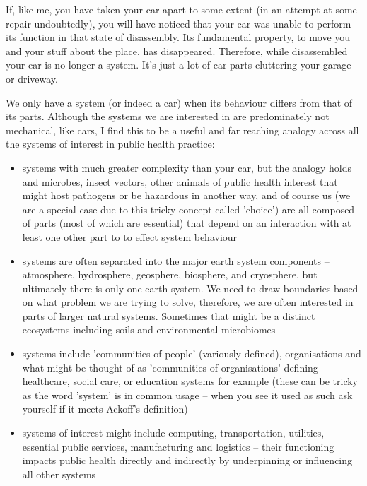 If, like me, you have taken your car apart to some extent (in an attempt at some repair undoubtedly), you will have noticed that your car was unable to perform its function in that state of disassembly. Its fundamental property, to move you and your stuff about the place, has disappeared. Therefore, while disassembled your car is no longer a system. It's just a lot of car parts cluttering your garage or driveway.

We only have a system (or indeed a car) when its behaviour differs from that of its parts. Although the systems we are interested in are predominately not mechanical, like cars, I find this to be a useful and far reaching analogy across all the systems of interest in public health practice:

\begin{itemize}[leftmargin=2cm]
	\item[organisms] systems with much greater complexity than your car, but the analogy holds and microbes, insect vectors, other animals of public health interest that might host pathogens or be hazardous in another way, and of course us (we are a special case due to this tricky concept called 'choice') are all composed of parts (most of which are essential) that depend on an interaction with at least one other part to to effect system behaviour
	\item[natural] systems are often separated into the major earth system components -- atmosphere, hydrosphere, geosphere, biosphere, and cryosphere, but ultimately there is only one earth system. We need to draw boundaries based on what problem we are trying to solve, therefore, we are often interested in parts of larger natural systems. Sometimes that might be a distinct ecosystems including soils and environmental microbiomes
	\item[social] systems include 'communities of people' (variously defined), organisations and what might be thought of as 'communities of organisations' defining healthcare, social care, or education systems for example (these can be tricky as the word 'system' is in common usage -- when you see it used as such ask yourself if it meets Ackoff's definition)
	\item[technical] systems of interest might include computing, transportation, utilities, essential public services, manufacturing and logistics -- their functioning impacts public health directly and indirectly by underpinning or influencing all other systems
\end{itemize} 

